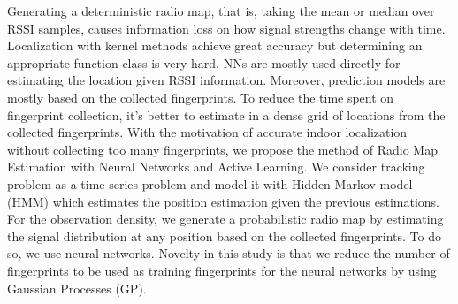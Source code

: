 \documentclass{article}
\begin{document}
	Generating a deterministic radio map, that is, taking the mean or median over RSSI samples, causes information loss on how signal strengths change with time. Localization with kernel methods achieve great accuracy \cite{Roo2002} but determining an appropriate function class is very hard. NNs are mostly used directly for estimating the location given RSSI information. Moreover, prediction models are mostly based on the collected fingerprints. To reduce the time spent on fingerprint collection, it's better to estimate in a dense grid of locations from the collected fingerprints. With the motivation of accurate indoor localization without collecting too many fingerprints, we propose the method of Radio Map Estimation with Neural Networks and Active Learning. We consider tracking problem as a time series problem and model it with Hidden Markov model (HMM) which estimates the position estimation given the previous estimations. For the observation density, we generate a probabilistic radio map by estimating the signal distribution at any position based on the collected fingerprints. To do so, we use neural networks. Novelty in this study is that we reduce the number of fingerprints to be used as training fingerprints for the neural networks by using Gaussian Processes (GP). %
	
\end{document}
